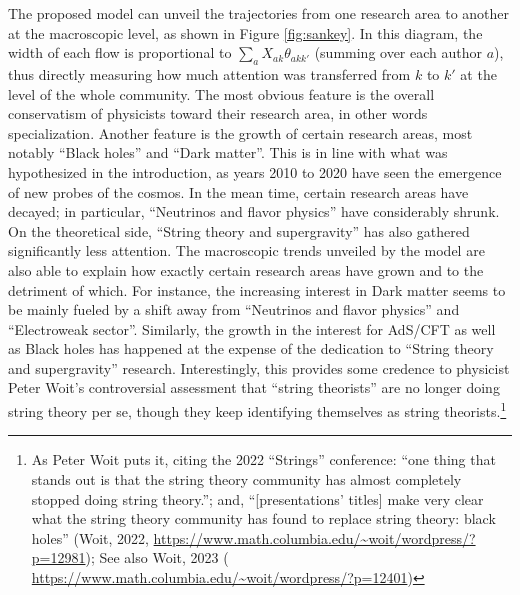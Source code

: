 \documentclass{article}
\begin{document}
The proposed model can unveil the trajectories from one research area to another at the macroscopic level, as shown in Figure \ref{fig:sankey}. In this diagram, the width of each flow is proportional to $\sum_a X_{ak}\theta_{akk'}$ (summing over each author $a$), thus directly measuring how much attention was transferred from $k$ to $k'$ at the level of the whole community. The most obvious feature is the overall conservatism of physicists toward their research area, in other words specialization. Another feature is the growth of certain research areas, most notably ``Black holes'' and ``Dark matter''. This is in line with what was hypothesized in the introduction, as years 2010 to 2020 have seen the emergence of new probes of the cosmos. In the mean time, certain research areas have decayed; in particular, ``Neutrinos and flavor physics'' have considerably shrunk. %
On the theoretical side, ``String theory and supergravity'' has also gathered significantly less attention. The macroscopic trends unveiled by the model are also able to explain how exactly certain research areas have grown and to the detriment of which. For instance, the increasing interest in Dark matter seems to be mainly fueled by a shift away from ``Neutrinos and flavor physics'' and ``Electroweak sector''. Similarly, the growth in the interest for AdS/CFT as well as Black holes has happened at the expense of the dedication to ``String theory and supergravity'' research. Interestingly, this provides some credence to physicist Peter Woit's controversial assessment that ``string theorists'' are no longer doing string theory per se, though they keep identifying themselves as string theorists.\footnote{As Peter Woit puts it, citing the 2022 ``Strings'' conference: ``one thing that stands out is that the string theory community has almost completely stopped doing string theory.''; and, ``[presentations' titles] make very clear what the string theory community has found to replace string theory: black holes'' (Woit, 2022, \url{https://www.math.columbia.edu/~woit/wordpress/?p=12981}); See also Woit, 2023 ( \url{https://www.math.columbia.edu/~woit/wordpress/?p=12401})}
\end{document}
